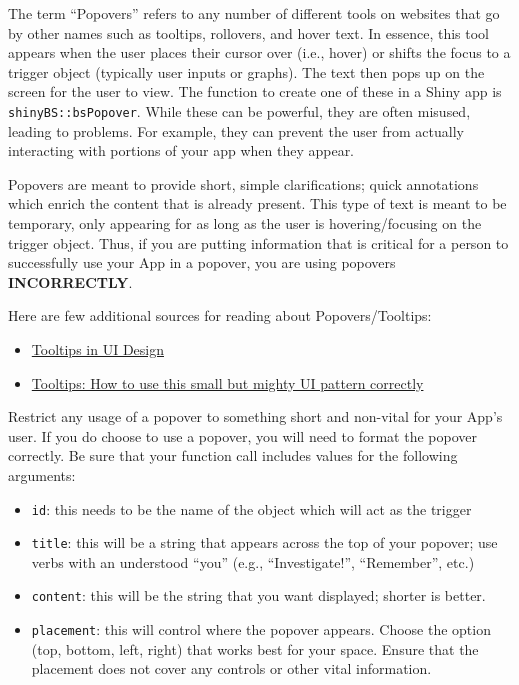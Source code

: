 \documentclass[
]{book}
\providecommand{\tightlist}{%
  \setlength{\itemsep}{0pt}\setlength{\parskip}{0pt}}
\begin{document}
The term ``Popovers'' refers to any number of different tools on websites that go by other names such as tooltips, rollovers, and hover text. In essence, this tool appears when the user places their cursor over (i.e., hover) or shifts the focus to a trigger object (typically user inputs or graphs). The text then pops up on the screen for the user to view. The function to create one of these in a Shiny app is \texttt{shinyBS::bsPopover}. While these can be powerful, they are often misused, leading to problems. For example, they can prevent the user from actually interacting with portions of your app when they appear.

Popovers are meant to provide short, simple clarifications; quick annotations which enrich the content that is already present. This type of text is meant to be temporary, only appearing for as long as the user is hovering/focusing on the trigger object. Thus, if you are putting information that is critical for a person to successfully use your App in a popover, you are using popovers \textbf{INCORRECTLY}.

Here are few additional sources for reading about Popovers/Tooltips:

\begin{itemize}
\tightlist
\item
  \href{https://uxplanet.org/tooltips-in-ui-design-f63e117aa3d1}{Tooltips in UI Design}
\item
  \href{https://www.appcues.com/blog/tooltips}{Tooltips: How to use this small but mighty UI pattern correctly}
\end{itemize}

Restrict any usage of a popover to something short and non-vital for your App's user. If you do choose to use a popover, you will need to format the popover correctly. Be sure that your function call includes values for the following arguments:

\begin{itemize}
\tightlist
\item
  \texttt{id}: this needs to be the name of the object which will act as the trigger
\item
  \texttt{title}: this will be a string that appears across the top of your popover; use verbs with an understood ``you'' (e.g., ``Investigate!'', ``Remember'', etc.)
\item
  \texttt{content}: this will be the string that you want displayed; shorter is better.
\item
  \texttt{placement}: this will control where the popover appears. Choose the option (top, bottom, left, right) that works best for your space. Ensure that the placement does not cover any controls or other vital information.
\end{itemize}
\end{document}
